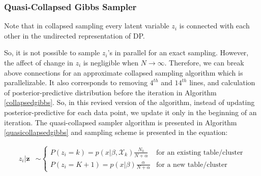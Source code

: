\documentclass[12pt, a4paper]{article}
\begin{document}
\subsubsection{Quasi-Collapsed Gibbs Sampler}

Note that in collapsed sampling every latent variable $z_i$ is connected with each other in the undirected representation of DP.

\begin{center}
\end{center}

So, it is not possible to sample $z_i$'s in parallel for an exact sampling. However, the affect of change in $z_i$ is negligible when $N \rightarrow \infty$. Therefore, we can break above connections for an approximate collapsed sampling algorithm which is parallelizable. It also corresponds to removing $4^{th}$ and $14^{th}$ lines, and calculation of posterior-predictive distribution before the iteration in Algorithm \ref{collapsedgibbs}. So, in this revised version of the algorithm, instead of updating posterior-predictive for each data point, we update it only in the beginning of an iteration. The quasi-collapsed sampler algorithm is presented in Algorithm \ref{quasicollapsedgibbs} and sampling scheme is presented in the equation:

\begin{align*}
z_i|\boldsymbol z &\sim \begin{cases}
P(z_i=k)=p(x|\beta,\mathcal{X}_{k})\frac{N_{k}}{N+\alpha} & \text{for an existing table/cluster} \\
P(z_i=K+1)=p(x|\beta)\frac{\alpha}{N+\alpha} & \text{for a new table/cluster}
\end{cases}
\end{align*}
\end{document}

